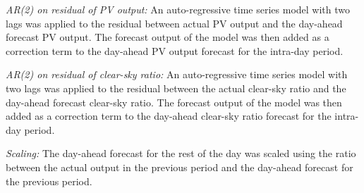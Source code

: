 \textit{AR(2) on residual of PV output:}
An auto-regressive time series model with two lags was applied to the residual between actual PV output and the day-ahead forecast PV output. The forecast output of the model was then added as a correction term to the day-ahead PV output forecast for the intra-day period.

\textit{AR(2) on residual of clear-sky ratio:}
An auto-regressive time series model with two lags was applied to the residual between the actual clear-sky ratio and the day-ahead forecast clear-sky ratio. The forecast output of the model was then added as a correction term to the day-ahead clear-sky ratio forecast for the intra-day period.

\textit{Scaling:}
The day-ahead forecast for the rest of the day was scaled using the ratio between the actual output in the previous period and the day-ahead forecast for the previous period.

